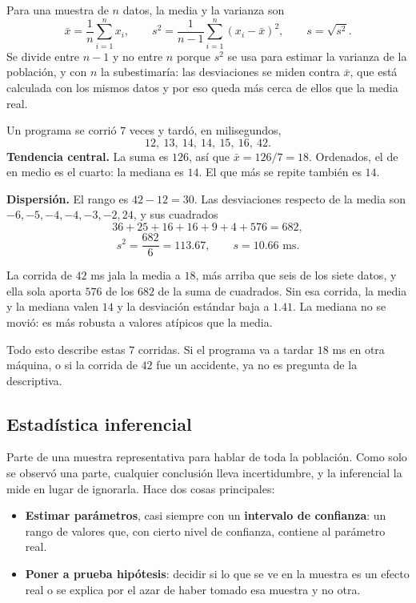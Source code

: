 \documentclass[11pt,letterpaper]{article}
\begin{document}
Para una muestra de $n$ datos, la media y la varianza son
\[
    \bar{x} = \frac{1}{n} \sum_{i=1}^{n} x_i ,
    \qquad
    s^2 = \frac{1}{n - 1} \sum_{i=1}^{n} \left(x_i - \bar{x}\right)^2 ,
    \qquad
    s = \sqrt{s^2} .
\]
Se divide entre $n - 1$ y no entre $n$ porque $s^2$ se usa para
estimar la varianza de la población, y con $n$ la subestimaría: las
desviaciones se miden contra $\bar{x}$, que está calculada con los
mismos datos y por eso queda más cerca de ellos que la media real.

\begin{ejemplo}
    Un programa se corrió $7$ veces y tardó, en milisegundos,
    \[
        12,\ 13,\ 14,\ 14,\ 15,\ 16,\ 42 .
    \]
    \textbf{Tendencia central.} La suma es $126$, así que
    $\bar{x} = 126 / 7 = 18$. Ordenados, el de en medio es el cuarto:
    la mediana es $14$. El que más se repite también es $14$.

    \textbf{Dispersión.} El rango es $42 - 12 = 30$. Las desviaciones
    respecto de la media son $-6, -5, -4, -4, -3, -2, 24$, y sus
    cuadrados
    \[
        36 + 25 + 16 + 16 + 9 + 4 + 576 = 682 ,
    \]
    \[
        s^2 = \frac{682}{6} = 113.67 , \qquad s = 10.66 \text{ ms}.
    \]

    La corrida de $42$ ms jala la media a $18$, más arriba que seis de
    los siete datos, y ella sola aporta $576$ de los $682$ de la suma
    de cuadrados. Sin esa corrida, la media y la mediana valen $14$ y
    la desviación estándar baja a $1.41$. La mediana no se movió: es
    más robusta a valores atípicos que la media.

    Todo esto describe estas $7$ corridas. Si el programa va a tardar
    $18$ ms en otra máquina, o si la corrida de $42$ fue un accidente,
    ya no es pregunta de la descriptiva.
\end{ejemplo}


\subsection*{Estadística inferencial}

Parte de una muestra representativa para hablar de toda la población.
Como solo se observó una parte, cualquier conclusión lleva
incertidumbre, y la inferencial la mide en lugar de ignorarla. Hace
dos cosas principales:

\begin{itemize}[itemsep=0.3em]
    \item \textbf{Estimar parámetros}, casi siempre con un
          \textbf{intervalo de confianza}: un rango de valores que, con
          cierto nivel de confianza, contiene al parámetro real.
    \item \textbf{Poner a prueba hipótesis}: decidir si lo que se ve en
          la muestra es un efecto real o se explica por el azar de
          haber tomado esa muestra y no otra.
\end{itemize}
\end{document}
